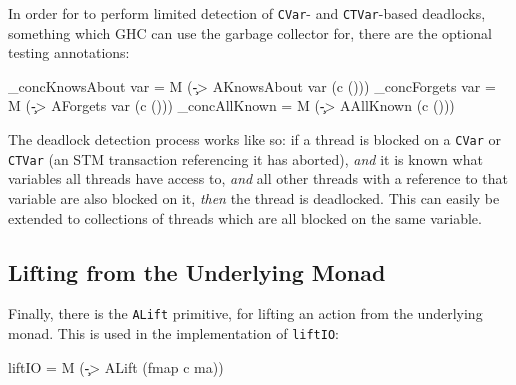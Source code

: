 In order for \dejafu{} to perform limited detection of \verb|CVar|-
and \verb|CTVar|-based deadlocks, something which GHC can use the
garbage collector for, there are the optional testing annotations:

\begin{haskellcode}
_concKnowsAbout var = M (\c -> AKnowsAbout var (c ()))
_concForgets    var = M (\c -> AForgets    var (c ()))
_concAllKnown       = M (\c -> AAllKnown       (c ()))
\end{haskellcode}




The deadlock detection process works like so: if a thread is blocked
on a \verb|CVar| or \verb|CTVar| (an STM transaction referencing it
has aborted), \emph{and} it is known what variables all threads have
access to, \emph{and} all other threads with a reference to that
variable are also blocked on it, \emph{then} the thread is
deadlocked. This can easily be extended to collections of threads
which are all blocked on the same variable.

\subsection{Lifting from the Underlying Monad}
\label{sec:execution-primops-lift}

Finally, there is the \verb|ALift| primitive, for lifting an action
from the underlying monad. This is used in the implementation of
\verb|liftIO|:

\begin{haskellcode}
liftIO = M (\c -> ALift (fmap c ma))
\end{haskellcode}

